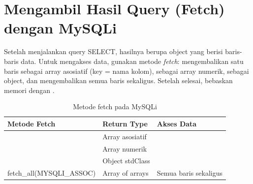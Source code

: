 ﻿\section[Mengambil Hasil Query (Fetch) dengan MySQLi]{Mengambil Hasil Query (Fetch) dengan MySQLi}

Setelah menjalankan query SELECT, hasilnya berupa object  yang berisi baris-baris data. Untuk mengakses data, gunakan metode \textit{fetch}:  mengembalikan satu baris sebagai array asosiatif (key = nama kolom),  sebagai array numerik,  sebagai object, dan  mengembalikan semua baris sekaligus. Setelah selesai, bebaskan memori dengan  \cite{phpManual}.

\begin{table}[H]
\centering
\begin{tabular}{|P{3.5cm}|P{4cm}|P{5cm}|}
\hline
\textbf{Metode Fetch} & \textbf{Return Type} & \textbf{Akses Data} \\
\hline
{} & Array asosiatif &  \\
\hline
{} & Array numerik &  \\
\hline
{} & Object stdClass &  \\
\hline
\parbox[t]{3.5cm}{\raggedright\ttfamily\footnotesize fetch\_all(MYSQLI\_ASSOC)} & Array of arrays & Semua baris sekaligus \\
\hline
\end{tabular}
\caption{Metode fetch pada MySQLi}
\end{table}


